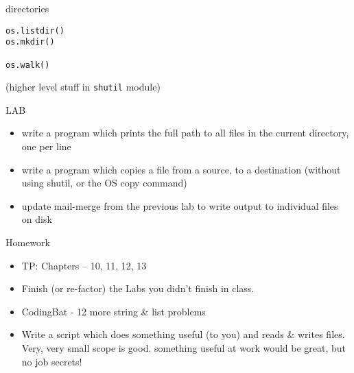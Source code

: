 \documentclass{beamer}
\begin{document}
\begin{frame}[fragile]{directories}

\vfill
\begin{verbatim}
os.listdir()
os.mkdir()

os.walk()

\end{verbatim}

\vfill
(higher level stuff in \verb|shutil| module)

\end{frame}

\begin{frame}{LAB}

\begin{itemize}
  \item write a program which prints the full path to all files in the current
        directory, one per line
  \item write a program which copies a file from a source, to a
        destination (without using shutil, or the OS copy command)
   \item update mail-merge from the previous lab to write output
         to individual files on disk
\end{itemize}

\end{frame}

\begin{frame}{Homework}

\begin{itemize}
  \item TP: Chapters -- 10, 11, 12, 13
  \item Finish (or re-factor) the Labs you didn't finish in class.
  \item CodingBat - 12 more string & list problems
  \item Write a script which does something useful (to you) and reads & writes
        files. Very, very small scope is good. something useful at work would
        be great, but no job secrets!
\end{itemize}

\end{frame}
\end{document}
